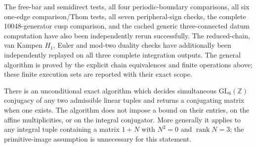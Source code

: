 The free-bar and semidirect tests, all four periodic-boundary
comparisons, all six one-edge comparison/Thom tests, all seven
peripheral-sign checks, the complete 10048-generator cusp
comparison, and the cached generic three-connected datum computation have
also been independently rerun successfully.  The
reduced-chain, van Kampen $H_1$, Euler and mod-two duality
checks have additionally been independently replayed on
all three complete integration outputs.  The general
algorithm is proved by the explicit chain equivalences and
finite operations above; these finite execution sets are
reported with their exact scope.







\begin{theorem}\hypertarget{tag-02NR}{}\label{maps:src:F.2.36}


There is an unconditional exact algorithm which decides simultaneous
$\mathrm{GL}_6(\mathbb Z)$ conjugacy of any two admissible linear tuples and returns a conjugating matrix when one exists. The algorithm
does not impose a bound on their entries, on the affine multiplicities,
or on the integral conjugator. More generally it applies to any integral
tuple containing a matrix $1+N$ with $N^2=0$ and $\operatorname{rank}N=3$;
the primitive-image assumption is unnecessary for this statement.

\end{theorem}



